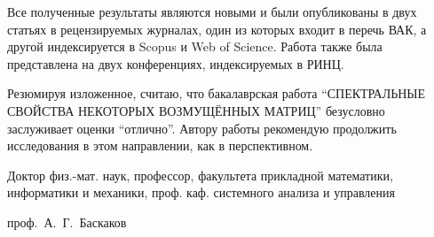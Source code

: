 Все полученные результаты являются новыми и были опубликованы в двух статьях в
рецензируемых журналах, один из которых входит в перечь ВАК, а другой
индексируется в Scopus и Web of Science. Работа также была представлена на двух
конференциях, индексируемых в РИНЦ.

Резюмируя изложенное, считаю, что бакалаврская работа
``СПЕК\-ТРАЛЬНЫЕ СВОЙСТВА НЕКОТОРЫХ ВОЗМУЩЁННЫХ МАТРИЦ''
безусловно заслуживает оценки ``отлично''.
Автору работы рекомендую продолжить исследования в этом направлении, как в
перспективном.

\vfill
\begin{minipage}{12em}
Доктор физ.-мат. наук, профессор,
факультета прикладной математики, информатики и механики,
проф. каф. системного анализа и управления
\end{minipage}
\hfill
проф.~А.~Г.~Баскаков
